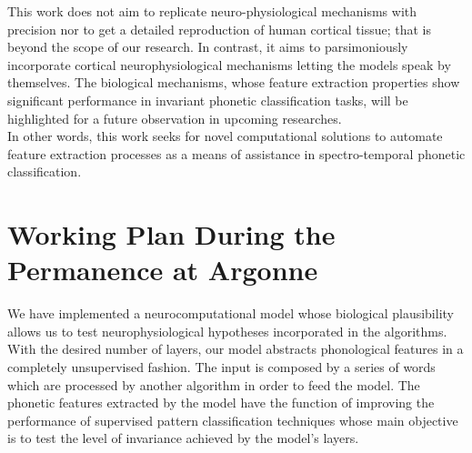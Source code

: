 \documentclass[11pt,a4paper]{article}
\begin{document}
This work does not aim to replicate 
neuro-physiological mechanisms with precision nor to get a detailed reproduction
of human cortical tissue; that is beyond the scope of our research. 
In contrast, it aims to parsimoniously incorporate cortical
neurophysiological mechanisms letting the models
speak by themselves.
The biological mechanisms, whose feature extraction
properties show significant performance
in invariant phonetic classification tasks, will be
highlighted for a future observation in upcoming researches. \\

In other words, this work seeks for novel computational solutions
to automate feature extraction processes as a means
of assistance in spectro-temporal phonetic classification. \\




















\section{Working Plan During the Permanence at Argonne}

We have implemented a neurocomputational model whose biological plausibility
allows us to test neurophysiological hypotheses incorporated in the algorithms.
With the desired number of layers, our model abstracts phonological features
in a completely unsupervised fashion.
The input is composed by a series of words which are processed by another algorithm
in order to feed the model.
The phonetic features extracted by the model have the function of improving
the performance of supervised pattern classification techniques
whose main objective is to test the level of invariance achieved by the model's layers. \\
\end{document}
